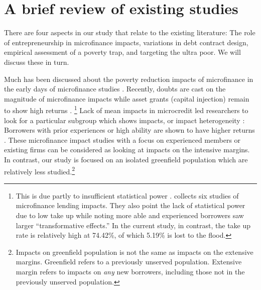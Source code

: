 \section{A brief review of existing studies}
\label{SecExistingStudies}

	There are four aspects in our study that relate to the existing literature: The role of entrepreneurship in microfinance impacts, variations in debt contract design, empirical assessment of a poverty trap, and targeting the ultra poor. We will discuss these in turn.

	Much has been discussed about the poverty reduction impacts of microfinance in the early days of microfinance studies \citep{PittKhandker1998, Morduch1999}. Recently, doubts are cast on the magnitude of microfinance impacts \citep{BanerjeeKarlanZinman2015, DuvendackMader2019, Meager2019} while asset grants (capital injection) remain to show high returns \citep{deMel2008, DeMel2014, FafchampsFlypaper2014, BandieraBRAC2017, BueraKaboskiShin2020}. \footnote{This is due partly to insufficient statistical power \citep{MckenzieWoodruff2013}. \citet{BanerjeeKarlanZinman2015} collects six studies of microfinance lending impacts. They also point the lack of statistical power due to low take up while noting more able and experienced borrowers saw larger ``transformative effects.'' %
	In the current study, in contrast, the take up rate is relatively high at 74.42\%, of which 5.19\% is lost to the flood.  } Lack of mean impacts in microcredit led researchers to look for a particular subgroup which shows impacts, or impact heterogeneity \citep{Banerjee2017HyderabadFollowup}: Borrowers with prior experiences or high ability are shown to have higher returns \citep{Banerjee2015Miracle, Mckenzie2017Spurring, Banerjee2019MFPovertyTrap, BueraKaboskiShin2020}. These microfinance impact studies with a focus on experienced members or existing firms can be considered as looking at impacts on the intensive margins. In contrast, our study is focused on an isolated greenfield population which are relatively less studied.\footnote{Impacts on greenfield population is not the same as impacts on the extensive margins. Greenfield refers to a previously unserved population. Extensive margin refers to impacts on \textit{any} new borrowers, including those not in the previously unserved population. } 

